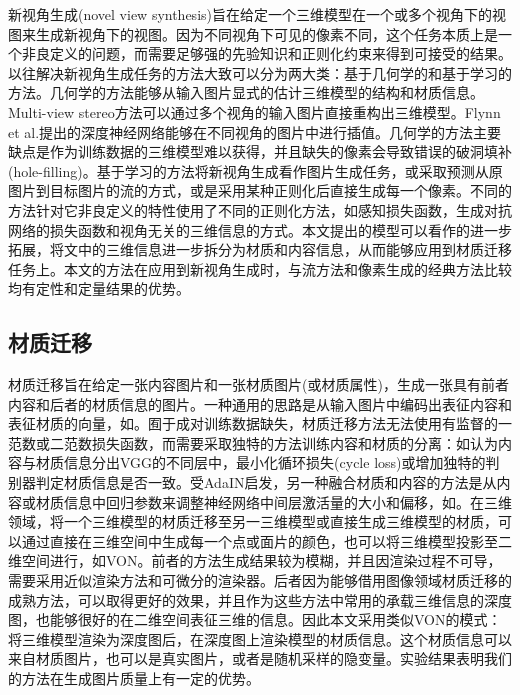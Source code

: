 \documentclass[UTF8,openany,AutoFakeBold,AutoFakeSlant,cs4size]{ctexbook}
\begin{document}
新视角生成(novel view synthesis)旨在给定一个三维模型在一个或多个视角下的视图来生成新视角下的视图。因为不同视角下可见的像素不同，这个任务本质上是一个非良定义的问题，而需要足够强的先验知识和正则化约束来得到可接受的结果。以往解决新视角生成任务的方法大致可以分为两大类：基于几何学的和基于学习的方法。几何学的方法能够从输入图片显式的估计三维模型的结构和材质信息。Multi-view stereo\cite{Furukawa:2015:MST:2864699.2864700}方法可以通过多个视角的输入图片直接重构出三维模型。Flynn et al.\cite{7780964}提出的深度神经网络能够在不同视角的图片中进行插值。几何学的方法主要缺点是作为训练数据的三维模型难以获得，并且缺失的像素会导致错误的破洞填补(hole-filling)。基于学习的方法将新视角生成看作图片生成任务，或采取预测从原图片到目标图片的流\cite{Zhou2016ViewSB, sun2018multiview, olszewski2019tbn}的方式，或是采用某种正则化后直接生成每一个像素\cite{TDB16a, Huang_2017_ICCV, VIGAN, Park2017TransformationGroundedIG}。不同的方法针对它非良定义的特性使用了不同的正则化方法，如感知损失函数\cite{olszewski2019tbn}，生成对抗网络的损失函数\cite{Huang_2017_ICCV}和视角无关的三维信息\cite{VIGAN}的方式。本文提出的模型可以看作\cite{VIGAN}的进一步拓展，将文中的三维信息进一步拆分为材质和内容信息，从而能够应用到材质迁移任务上。本文的方法在应用到新视角生成时，与流方法和像素生成的经典方法比较均有定性和定量结果的优势。

\subsection{材质迁移}

材质迁移旨在给定一张内容图片和一张材质图片(或材质属性)，生成一张具有前者内容和后者的材质信息的图片。一种通用的思路是从输入图片中编码出表征内容和表征材质的向量，如\cite{zheng2019joint, BeautyGlow, Li2018BeautyGANIF, Wu2019DisentanglingCA}。囿于成对训练数据缺失，材质迁移方法无法使用有监督的一范数或二范数损失函数，而需要采取独特的方法训练内容和材质的分离：如认为内容与材质信息分出VGG的不同层中\cite{7780634}，最小化循环损失(cycle loss)\cite{Lu2017ConditionalCF}或增加独特的判别器判定材质信息是否一致\cite{pix2pixSC2019, ma2017pose}。受AdaIN\cite{huang2017adain}启发，另一种融合材质和内容的方法是从内容或材质信息中回归参数来调整神经网络中间层激活量的大小和偏移，如\cite{zhu2019sean, park2019SPADE}。在三维领域，将一个三维模型的材质迁移至另一三维模型或直接生成三维模型的材质，可以通过直接在三维空间中生成每一个点或面片的颜色\cite{cmrKanazawa18}，也可以将三维模型投影至二维空间进行，如VON\cite{VON}。前者的方法生成结果较为模糊，并且因渲染过程不可导，需要采用近似渲染方法和可微分的渲染器\cite{Kato_2018_CVPR}。后者因为能够借用图像领域材质迁移的成熟方法，可以取得更好的效果，并且作为这些方法中常用的承载三维信息的深度图，也能够很好的在二维空间表征三维的信息。因此本文采用类似VON的模式：将三维模型渲染为深度图后，在深度图上渲染模型的材质信息。这个材质信息可以来自材质图片，也可以是真实图片，或者是随机采样的隐变量。实验结果表明我们的方法在生成图片质量上有一定的优势。
\end{document}
